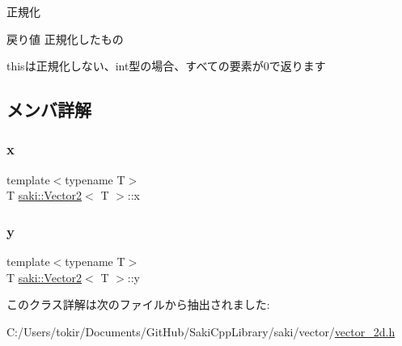正規化 

\begin{DoxyReturn}{戻り値}
正規化したもの
\end{DoxyReturn}
thisは正規化しない、int型の場合、すべての要素が0で返ります 

\subsection{メンバ詳解}
\mbox{\label{classsaki_1_1_vector2_a69df7df6da198f35ef8ed269eb095c27}} 
\subsubsection{\texorpdfstring{x}{x}}
{\footnotesize\ttfamily template$<$typename T$>$ \\
T \mbox{\hyperlink{classsaki_1_1_vector2}{saki\+::\+Vector2}}$<$ T $>$\+::x}

\mbox{\label{classsaki_1_1_vector2_a54e83290254fb653eff9b8dcf6a10878}} 
\subsubsection{\texorpdfstring{y}{y}}
{\footnotesize\ttfamily template$<$typename T$>$ \\
T \mbox{\hyperlink{classsaki_1_1_vector2}{saki\+::\+Vector2}}$<$ T $>$\+::y}



このクラス詳解は次のファイルから抽出されました\+:\begin{DoxyCompactItemize}
\item 
C\+:/\+Users/tokir/\+Documents/\+Git\+Hub/\+Saki\+Cpp\+Library/saki/vector/\mbox{\hyperlink{vector__2d_8h}{vector\+\_\+2d.\+h}}\end{DoxyCompactItemize}
